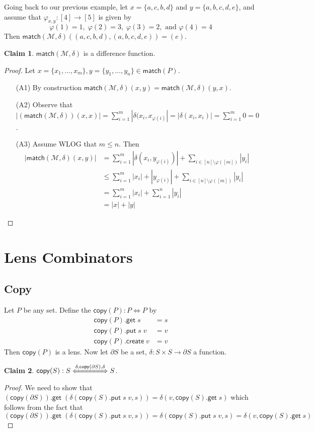 \documentclass[acmsmall,review,anonymous]{acmart}\settopmatter{printfolios=true,printccs=false,printacmref=false}
\theoremstyle{definition}
\newtheorem{claim}{Claim}
\newcommand{\kw}[1]{\ensuremath{\mathsf{#1}}\xspace}
\newcommand{\get}{\ensuremath{\kw{get}}\xspace}
\newcommand{\pput}{\ensuremath{\kw{put}}\xspace}
\newcommand{\create}{\ensuremath{\kw{create}}\xspace}
\newcommand{\ccopy}{\ensuremath{\kw{copy}}\xspace}
\newcommand{\match}{\ensuremath{\kw{match}}\xspace}
\begin{document}
Going back to our previous example, let $x = \{a, c, b, d\}$ and $y = \{a, b, c,
d, e\}$, and assume that $\varphi_{x, y} : [4] \longrightarrow [5]$ is given by
$$\varphi(1) = 1, \; \varphi(2) = 3, \; \varphi(3) = 2, \text{ and } \varphi(4)
= 4$$ Then $\match(\mathcal{M}, \delta)((a, c, b, d), (a, b, c, d, e)) =
(e)$.
\begin{claim}
$\match(\mathcal{M}, \delta)$ is a difference function.
\end{claim}
\begin{proof}
Let $x = \{x_1, \ldots, x_m\}, y = \{y_1, \ldots, y_n\} \in \match(P)$.
\begin{enumerate}
  \item[(A1)]
  By construction $\match(\mathcal{M}, \delta)(x, y) =
  \match(\mathcal{M}, \delta)(y, x)$.
  \item[(A2)] Observe that $|(\match(\mathcal{M}, \delta))(x, x)| =
  \sum_{i=1}^m|\delta(x_i, x_{\varphi(i)}| = |\delta(x_i, x_i)| =   \sum_{i=1}^m
  0 = 0$.
  \item[(A3)]
  Assume WLOG that $m \leq n$. Then
  \begin{align*}
|\match(\mathcal{M}, \delta)(x, y)| &=
\sum_{i=1}^m|\delta(x_i, y_{\varphi(i)})| + \sum_{i \in [n] \setminus
\varphi([m])} |y_i|\\
&\leq \sum_{i=1}^m|x_i| + |y_{\varphi(i)}| + \sum_{i \in [n] \setminus
\varphi([m])} |y_i|\\
&= \sum_{i=1}^m|x_i| + \sum_{i=1}^n |y_i|\\
&= |x| + |y|
\end{align*}
\end{enumerate}
\end{proof}
\fi
\section{Lens Combinators}
\subsection{Copy}
Let $P$ be any set. Define the $\ccopy(P) : P \Leftrightarrow P$ by
\begin{align}
\ccopy(P).\get \; s &= s\\
\ccopy(P).\pput \; s \; v &= v\\
\ccopy(P).\create \; v &= v
\end{align}
Then $\ccopy(P)$ is a lens. Now let $\partial S$ be a set, $\delta :
S \times S \longrightarrow \partial S$ a function.
\begin{claim}
$\ccopy(S) : S \xLeftrightarrow{\delta , \ccopy(\partial S), \delta} S$.
\end{claim}
\begin{proof}
We need to show that $(\ccopy(\partial S)).\get \; (\delta(\ccopy(S).\pput
\; s \; v, s)) = \delta(v, \ccopy(S).\get \; s)$ which follows from the fact
that $$ (\ccopy(\partial S)).\get \; (\delta(\ccopy(S).\pput \; s
\; v, s)) = \delta(\ccopy(S).\pput \; s \; v, s) = \delta(v, \ccopy(S).\get
\; s) $$
\end{proof}
\end{document}
